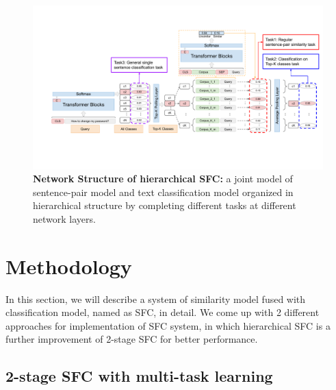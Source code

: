 \documentclass[letterpaper]{article} %
\begin{document}
  \begin{figure}[t]
    \begin{centering}
      \includegraphics[scale=0.72]{picture/picture4} 
      \par
    \end{centering}
    \caption{
      \textbf{Network   Structure   of  hierarchical  SFC:}  a  joint  model  of
      sentence-pair   model   and   text   classification   model  organized  in
      hierarchical  structure by completing different tasks at different network
      layers.
    }
    \label{fig:framework}
  \end{figure}

  \section{Methodology}
  In  this  section,  we  will  describe a system of similarity model fused with
  classification  model,  named  as  SFC, in detail. We come up with 2 different
  approaches  for  implementation  of SFC system, in which hierarchical SFC is a
  further improvement of 2-stage SFC for better performance.

  \subsection{2-stage SFC with multi-task learning}
\end{document}
